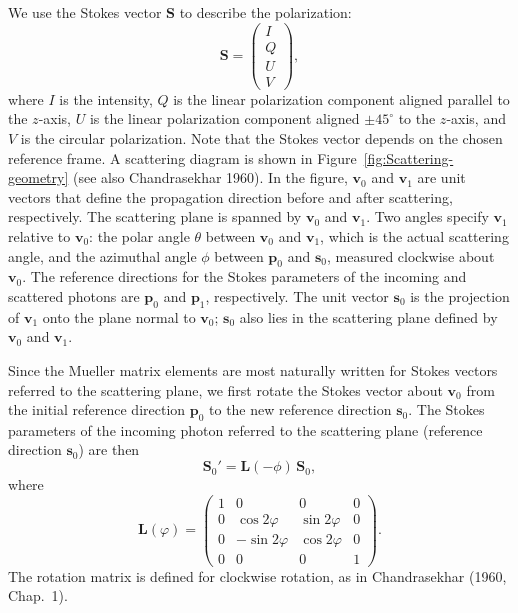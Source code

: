 \documentclass[english,a4paper]{kiseon_memo}
\begin{document}
We use the Stokes vector $\mathbf{S}$ to describe the polarization:
\[
\mathbf{S}=\left(\begin{array}{c}
I\\ Q\\ U\\ V
\end{array}\right),
\]
where $I$ is the intensity, $Q$ is the linear polarization
component aligned parallel to the $z$-axis, $U$ is the linear
polarization component aligned $\pm 45^{\circ}$ to the $z$-axis,
and $V$ is the circular polarization. Note that the Stokes vector
depends on the chosen reference frame. A scattering diagram is
shown in Figure~\ref{fig:Scattering-geometry} (see also
Chandrasekhar 1960). In the figure, $\mathbf{v}_{0}$ and
$\mathbf{v}_{1}$ are unit vectors that define the propagation
direction before and after scattering, respectively. The
scattering plane is spanned by $\mathbf{v}_{0}$ and
$\mathbf{v}_{1}$. Two angles specify $\mathbf{v}_{1}$ relative to
$\mathbf{v}_{0}$: the polar angle $\theta$ between $\mathbf{v}_{0}$
and $\mathbf{v}_{1}$, which is the actual scattering angle, and
the azimuthal angle $\phi$ between $\mathbf{p}_{0}$ and
$\mathbf{s}_{0}$, measured clockwise about $\mathbf{v}_{0}$.
The reference directions for the Stokes parameters of the incoming
and scattered photons are $\mathbf{p}_{0}$ and $\mathbf{p}_{1}$,
respectively. The unit vector $\mathbf{s}_{0}$ is the projection
of $\mathbf{v}_{1}$ onto the plane normal to $\mathbf{v}_{0}$;
$\mathbf{s}_{0}$ also lies in the scattering plane defined by
$\mathbf{v}_{0}$ and $\mathbf{v}_{1}$.

Since the Mueller matrix elements are most naturally written for
Stokes vectors referred to the scattering plane, we first rotate
the Stokes vector about $\mathbf{v}_{0}$ from the initial
reference direction $\mathbf{p}_{0}$ to the new reference direction
$\mathbf{s}_{0}$. The Stokes parameters of the incoming photon
referred to the scattering plane (reference direction
$\mathbf{s}_{0}$) are then
\[
\mathbf{S}_{0}'=\mathbf{L}(-\phi)\,\mathbf{S}_{0},
\]
where
\[
\mathbf{L}(\varphi)=\left(\begin{array}{cccc}
1 & 0 & 0 & 0\\
0 & \cos2\varphi & \sin2\varphi & 0\\
0 & -\sin2\varphi & \cos2\varphi & 0\\
0 & 0 & 0 & 1
\end{array}\right).
\]
The rotation matrix is defined for clockwise rotation, as in
Chandrasekhar (1960, Chap.~1).
\end{document}
